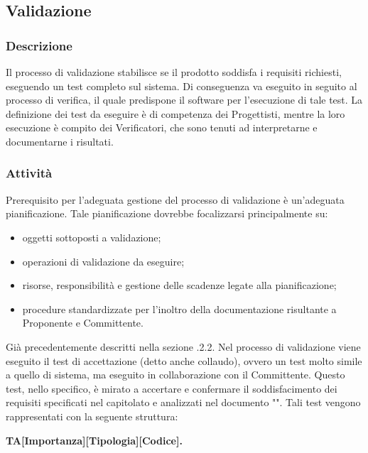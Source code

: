 \subsection{Validazione}
    \subsubsection{Descrizione}
      Il processo di validazione stabilisce se il prodotto soddisfa i requisiti richiesti, eseguendo un test completo sul sistema. Di conseguenza va eseguito in seguito al processo di verifica, il quale predispone il software per l'esecuzione di tale test. La definizione dei test da eseguire è di competenza dei Progettisti, mentre la loro esecuzione è compito dei Verificatori, che sono tenuti ad interpretarne e documentarne i risultati.
    \subsubsection{Attività}
      Prerequisito per l'adeguata gestione del processo di validazione è un'adeguata pianificazione. Tale pianificazione dovrebbe focalizzarsi principalmente su:
      \begin{itemize}
      	\item oggetti sottoposti a validazione;
      	\item operazioni di validazione da eseguire;
      	\item risorse, responsibilità e gestione delle scadenze legate alla pianificazione;
      	\item procedure standardizzate per l'inoltro della documentazione risultante a Proponente e Committente.
      \end{itemize}
      Già precedentemente descritti nella sezione .2.2.
      Nel processo di validazione viene eseguito il test di accettazione (detto anche collaudo), ovvero un test molto simile a quello di sistema, ma eseguito in collaborazione con il Committente. Questo test, nello specifico, è mirato a accertare e confermare il soddisfacimento dei requisiti specificati nel capitolato e analizzati nel documento "\AdR{}". Tali test vengono rappresentati con la seguente struttura: \\
      \begin{center}
      	\textbf{TA[Importanza][Tipologia][Codice].}
      \end{center}     
